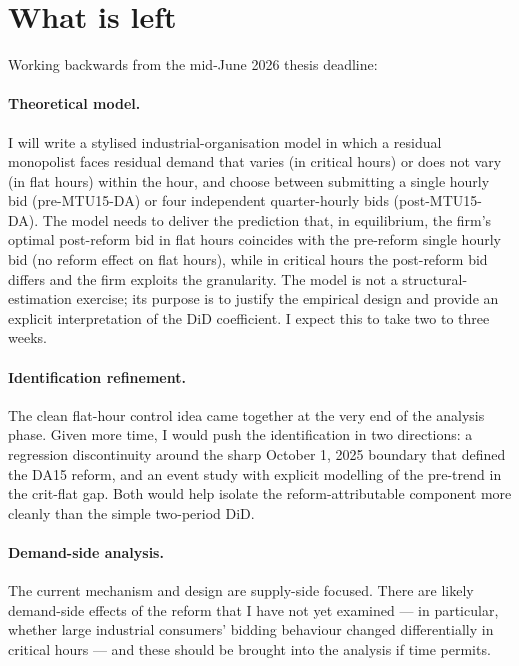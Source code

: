 \documentclass[11pt,a4paper]{article}
\begin{document}
\section{What is left}\label{sec:left}

Working backwards from the mid-June 2026 thesis deadline:

\paragraph{Theoretical model.} I will write a stylised industrial-organisation model in which a residual monopolist faces residual demand that varies (in critical hours) or does not vary (in flat hours) within the hour, and choose between submitting a single hourly bid (pre-MTU15-DA) or four independent quarter-hourly bids (post-MTU15-DA). The model needs to deliver the prediction that, in equilibrium, the firm's optimal post-reform bid in flat hours coincides with the pre-reform single hourly bid (no reform effect on flat hours), while in critical hours the post-reform bid differs and the firm exploits the granularity. The model is not a structural-estimation exercise; its purpose is to justify the empirical design and provide an explicit interpretation of the DiD coefficient. I expect this to take two to three weeks.

\paragraph{Identification refinement.} The clean flat-hour control idea came together at the very end of the analysis phase. Given more time, I would push the identification in two directions: a regression discontinuity around the sharp October 1, 2025 boundary that defined the DA15 reform, and an event study with explicit modelling of the pre-trend in the crit-flat gap. Both would help isolate the reform-attributable component more cleanly than the simple two-period DiD.

\paragraph{Demand-side analysis.} The current mechanism and design are supply-side focused. There are likely demand-side effects of the reform that I have not yet examined --- in particular, whether large industrial consumers' bidding behaviour changed differentially in critical hours --- and these should be brought into the analysis if time permits.
\end{document}
